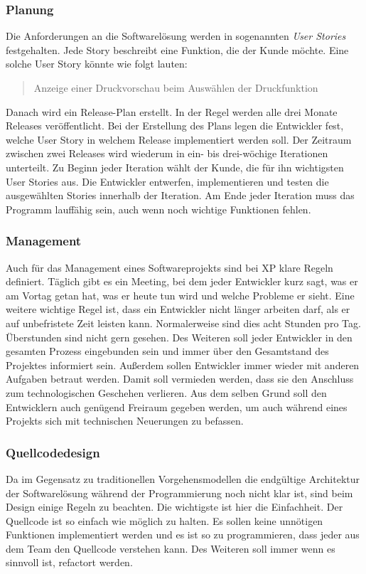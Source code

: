 \subsubsection{Planung}
Die Anforderungen an die Softwarelösung werden in sogenannten \emph{User Stories} festgehalten. Jede Story beschreibt eine Funktion, die der Kunde möchte. Eine solche User Story könnte wie folgt lauten:
\begin{quote}
Anzeige einer Druckvorschau beim Auswählen der Druckfunktion
\end{quote}
Danach wird ein Release-Plan erstellt. In der Regel werden alle drei Monate Releases veröffentlicht. Bei der Erstellung des Plans legen die Entwickler fest, welche User Story in welchem Release implementiert werden soll. Der Zeitraum zwischen zwei Releases wird wiederum in ein- bis drei-wöchige Iterationen unterteilt. Zu Beginn jeder Iteration wählt der Kunde, die für ihn wichtigsten User Stories aus. Die Entwickler entwerfen, implementieren und testen die ausgewählten Stories innerhalb der Iteration. Am Ende jeder Iteration muss das Programm lauffähig sein, auch wenn noch wichtige Funktionen fehlen.

\subsubsection{Management}
Auch für das Management eines Softwareprojekts sind bei XP klare Regeln definiert. Täglich gibt es ein Meeting, bei dem jeder Entwickler kurz sagt, was er am Vortag getan hat, was er heute tun wird und welche Probleme er sieht. Eine weitere wichtige Regel ist, dass ein Entwickler nicht länger arbeiten darf, als er auf unbefristete Zeit leisten kann. Normalerweise sind dies acht Stunden pro Tag. Überstunden sind nicht gern gesehen. Des Weiteren soll jeder Entwickler in den gesamten Prozess eingebunden sein und immer über den Gesamtstand des Projektes informiert sein. Außerdem sollen Entwickler immer wieder mit anderen Aufgaben betraut werden. Damit soll vermieden werden, dass sie den Anschluss zum technologischen Geschehen verlieren. Aus dem selben Grund soll den Entwicklern auch genügend Freiraum gegeben werden, um auch während eines Projekts sich mit technischen Neuerungen zu befassen.

\subsubsection{Quellcodedesign}
Da im Gegensatz zu traditionellen Vorgehensmodellen die endgültige Architektur der Softwarelösung während der Programmierung noch nicht klar ist, sind beim Design einige Regeln zu beachten. Die wichtigste ist hier die Einfachheit. Der Quellcode ist so einfach wie möglich zu halten. Es sollen keine unnötigen Funktionen implementiert werden und es ist so zu programmieren, dass jeder aus dem Team den Quellcode verstehen kann. Des Weiteren soll immer wenn es sinnvoll ist, refactort werden.

